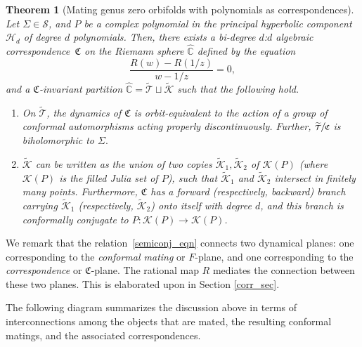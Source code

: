 \documentclass[JEP,XML,SOM,Unicode,NoFloatCountersInSection,published]{cedram}
\newtheorem{thmx}{Theorem}
\theoremstyle{definition}
\theoremstyle{remark}
\newcommand{\C}{\mathbb{C}}
\newcommand{\cS}{\mathcal{S}}
\newcommand{\cT}{\mathcal{T}}
\newcommand{\cK}{\mathcal{K}}
\begin{document}
\begin{thmx}[Mating genus zero orbifolds with polynomials as correspondences]\label{corr_mating_intro_thm}
Let $\Sigma\!\in\!\cS$, and $P$ be a complex polynomial in the principal hyperbolic component~$\mathcal{H}_d$ of degree $d$ polynomials.
Then, there exists a bi-degree $d$:$d$ algebraic correspondence~$\mathfrak{C}$ on the Riemann sphere $\widehat{\C}$ defined by the equation
\begin{equation}
\frac{R(w)-R(1/z)}{w-1/z}=0,
\label{corr_eqn_intro}
\end{equation}
and a $\mathfrak{C}$-invariant partition $\widehat{\C}=\widetilde{\cT}\sqcup\widetilde{\cK}$ such that the following hold.
\begin{enumerate}
\item On $\widetilde{\cT}$, the dynamics of $\mathfrak{C}$ is orbit-equivalent to the action of a group of conformal automorphisms acting properly discontinuously. Further, $\sfrac{\widetilde{\cT}}{\mathfrak{C}}$ is biholomorphic to $\Sigma.$
\item $\widetilde{\cK}$ can be written as the union of two copies $\widetilde{\cK}_1, \widetilde{\cK}_2$ of $\cK(P)$ (where $\cK(P)$ is the filled Julia set of $P$), such that $\widetilde{\cK}_1$ and $\widetilde{\cK}_2$ intersect in finitely many points. Furthermore, $\mathfrak{C}$ has a forward (respectively, backward) branch carrying $\widetilde{\cK}_1$ (respectively, $\widetilde{\cK}_2$) onto itself with degree $d$, and this branch is conformally conjugate to $P:\mathcal{K}(P)\to \mathcal{K}(P)$.
\end{enumerate}
\end{thmx}

We remark that the relation~\eqref{semiconj_eqn} connects two dynamical planes: one corresponding to the
\emph{conformal mating} or $F$-plane, and one corresponding to the
\emph{correspondence} or $\mathfrak{C}$-plane. The rational map $R$ mediates the connection between these two planes. This is elaborated upon in Section \ref{corr_sec}.

The following diagram summarizes the discussion above in terms of interconnections among the objects that are mated, the resulting conformal matings, and the associated correspondences.
\end{document}
